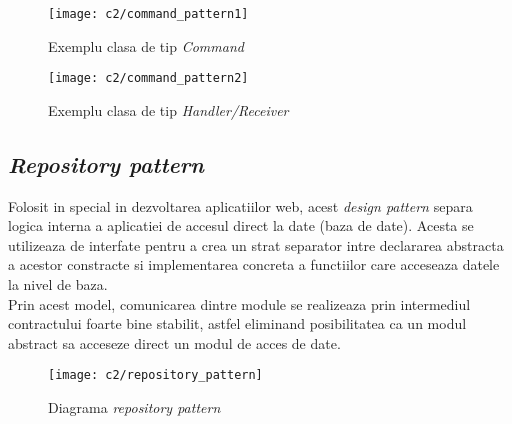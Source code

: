 \vspace{1cm}
\begin{figure}[h]
	\centering
	
	\texttt{[image: c2/command\_pattern1]}
	\caption{Exemplu clasa de tip \textit{Command}}
\end{figure}



\vspace{1cm}
\begin{figure}[h]
	\centering
	
	\texttt{[image: c2/command\_pattern2]}
	\caption{Exemplu clasa de tip \textit{Handler/Receiver}}
\end{figure}


\subsection*{\textit{Repository pattern}}

Folosit in special in dezvoltarea aplicatiilor web, acest \textit{design pattern} separa logica interna a aplicatiei de accesul direct la date (baza de date). Acesta se utilizeaza de interfate pentru a crea un strat separator intre declararea abstracta a acestor constracte si implementarea concreta a functiilor care acceseaza datele la nivel de baza.\\
Prin acest model, comunicarea dintre module se realizeaza prin intermediul contractului foarte bine stabilit, astfel eliminand posibilitatea ca un modul abstract sa acceseze direct un modul de acces de date.\\


\vspace{1cm}
\begin{figure}[h]
	\centering
	
	\texttt{[image: c2/repository\_pattern]}
	\caption{Diagrama \textit{repository pattern}}
\end{figure}


